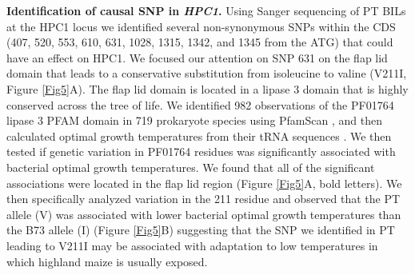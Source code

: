 \documentclass[9pt,twocolumn,twoside,lineno]{BioRxiv}
\begin{document}

\textbf{Identification of causal SNP in \textit{HPC1}.} Using Sanger sequencing of PT BILs at the HPC1 locus we identified several non-synonymous SNPs within the CDS (407, 520, 553, 610, 631, 1028, 1315, 1342, and 1345 from the ATG) that could have an effect on HPC1.
We focused our attention on SNP 631 on the flap lid domain that leads to a conservative substitution from isoleucine to valine (V211I, Figure \ref{Fig5}A).  
The flap lid domain is located in a lipase 3 domain that is highly conserved across the tree of life. 
We identified 982 observations of the PF01764 lipase 3 PFAM domain in 719 prokaryote species using PfamScan \cite{Potter2018-tk, El-Gebali2019-pw}, and then calculated optimal growth temperatures from their tRNA sequences \cite{Cimen2020-dm}.
We then tested if genetic variation in PF01764 residues was significantly associated with bacterial optimal growth temperatures. 
We found that all of the significant associations were located in the flap lid region  (Figure \ref{Fig5}A, bold letters).  
We then specifically analyzed variation in the 211 residue and observed that the PT allele (V) was associated with lower bacterial optimal growth temperatures than the B73 allele (I) (Figure \ref{Fig5}B) suggesting that the SNP we identified in PT leading to V211I may be associated with adaptation to low temperatures in which highland maize is usually exposed.
\end{document}
